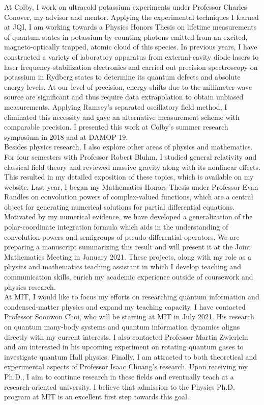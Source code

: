 \documentclass[12pt]{article}
\begin{document}
At Colby, I work on ultracold potassium experiments under Professor Charles Conover, my advisor and mentor. Applying the experimental techniques I learned at JQI, I am working towards a Physics Honors Thesis on lifetime measurements of quantum states in potassium by counting photons emitted from an excited, magneto-optically trapped, atomic cloud of this species. In previous years, I have constructed a variety of laboratory apparatus from external-cavity diode lasers to laser frequency-stabilization electronics and carried out precision spectroscopy on potassium in Rydberg states to determine its quantum defects and absolute energy levels. At our level of precision, energy shifts due to the millimeter-wave source are significant and thus require data extrapolation to obtain unbiased measurements. Applying Ramsey's separated oscillatory field method, I eliminated this necessity and gave an alternative measurement scheme with comparable precision. I presented this work at Colby's summer research symposium in 2018 and at DAMOP 19.  \\

Besides physics research, I also explore other areas of physics and mathematics. For four semesters with Professor Robert Bluhm, I studied general relativity and classical field theory and reviewed massive gravity along with its nonlinear effects. This resulted in my detailed exposition of these topics, which is available on my website. Last year, I began my Mathematics Honors Thesis under Professor Evan Randles on convolution powers of complex-valued functions, which are a central object for generating numerical solutions for partial differential equations. Motivated by my numerical evidence, we have developed a generalization of the polar-coordinate integration formula which aids in the understanding of convolution powers and semigroups of pseudo-differential operators. We are preparing a manuscript summarizing this result and will present it at the Joint Mathematics Meeting in January 2021. These projects, along with my role as a physics and mathematics teaching assistant in which I develop teaching and communication skills, enrich my academic experience outside of coursework and physics research.  \\ 

At MIT, I would like to focus my efforts on researching quantum information and condensed-matter physics and  expand my teaching capacity. I have contacted Professor Soonwon Choi, who will be starting at MIT in July 2021. His research on quantum many-body systems and quantum information dynamics aligns directly with my current interests. I also contacted Professor Martin Zwierlein and am interested in his upcoming experiment on rotating quantum gases to investigate quantum Hall physics. Finally, I am attracted to both theoretical and experimental aspects of Professor Isaac Chuang's research. Upon receiving my Ph.D., I aim to continue research in these fields and eventually teach at a research-oriented university. I believe that admission to the Physics Ph.D. program at MIT is an excellent first step towards this goal. \\
\end{document}
